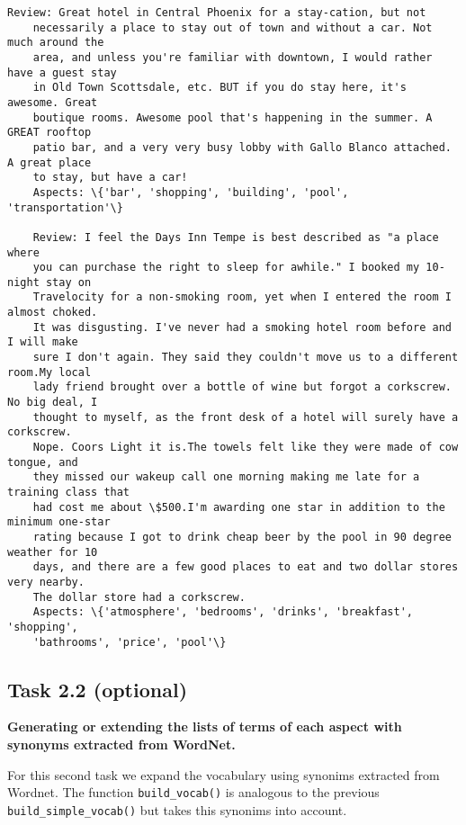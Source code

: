 \documentclass[11pt]{article}
\begin{document}
\begin{Verbatim}[commandchars=\\\{\}]
    Review: Great hotel in Central Phoenix for a stay-cation, but not
    necessarily a place to stay out of town and without a car. Not much around the
    area, and unless you're familiar with downtown, I would rather have a guest stay
    in Old Town Scottsdale, etc. BUT if you do stay here, it's awesome. Great
    boutique rooms. Awesome pool that's happening in the summer. A GREAT rooftop
    patio bar, and a very very busy lobby with Gallo Blanco attached. A great place
    to stay, but have a car!
    Aspects: \{'bar', 'shopping', 'building', 'pool', 'transportation'\}

    Review: I feel the Days Inn Tempe is best described as "a place where
    you can purchase the right to sleep for awhile." I booked my 10-night stay on
    Travelocity for a non-smoking room, yet when I entered the room I almost choked.
    It was disgusting. I've never had a smoking hotel room before and I will make
    sure I don't again. They said they couldn't move us to a different room.My local
    lady friend brought over a bottle of wine but forgot a corkscrew. No big deal, I
    thought to myself, as the front desk of a hotel will surely have a corkscrew.
    Nope. Coors Light it is.The towels felt like they were made of cow tongue, and
    they missed our wakeup call one morning making me late for a training class that
    had cost me about \$500.I'm awarding one star in addition to the minimum one-star
    rating because I got to drink cheap beer by the pool in 90 degree weather for 10
    days, and there are a few good places to eat and two dollar stores very nearby.
    The dollar store had a corkscrew.
    Aspects: \{'atmosphere', 'bedrooms', 'drinks', 'breakfast', 'shopping',
    'bathrooms', 'price', 'pool'\}

\end{Verbatim}

\hypertarget{task-2.2-optional}{%
    \subsection{Task 2.2 (optional)}\label{task-2.2-optional}}

\textbf{Generating or extending the lists of terms of each aspect with
    synonyms extracted from WordNet.}

For this second task we expand the vocabulary using synonims extracted
from Wordnet. The function \texttt{build\_vocab()} is analogous to the
previous \texttt{build\_simple\_vocab()} but takes this synonims into
account.
\end{document}
